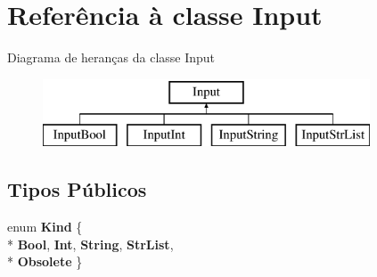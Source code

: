 \hypertarget{class_input}{\section{Referência à classe Input}
\label{class_input}
}
Diagrama de heranças da classe Input\begin{figure}[H]
\begin{center}
\leavevmode
\includegraphics[height=2.000000cm]{class_input}
\end{center}
\end{figure}
\subsection*{Tipos Públicos}
\begin{DoxyCompactItemize}
\item 
enum {\bfseries Kind} \{ \\*
{\bfseries Bool}, 
{\bfseries Int}, 
{\bfseries String}, 
{\bfseries Str\-List}, 
\\*
{\bfseries Obsolete}
 \}
\end{DoxyCompactItemize}
